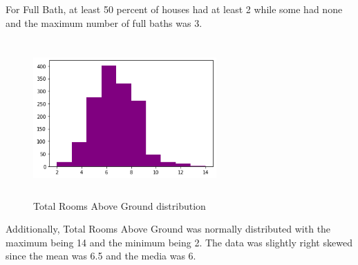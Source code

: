 \documentclass[fleqn,10pt]{SelfArx} %
\begin{document}
For Full Bath, at least 50 percent of houses had at least 2 while some had none and the maximum number of full baths was 3. 
\begin{figure}[H]
    \centering
    \includegraphics[width=7cm, height=6cm]{img/TotRmshist.png}
    \caption{Total Rooms Above Ground distribution}
    \label{fig:my_label}
\end{figure}
Additionally, Total Rooms Above Ground was normally distributed with the maximum being 14 and the minimum being 2. The data was slightly right skewed since the mean was 6.5 and the media was 6. 
\end{document}

